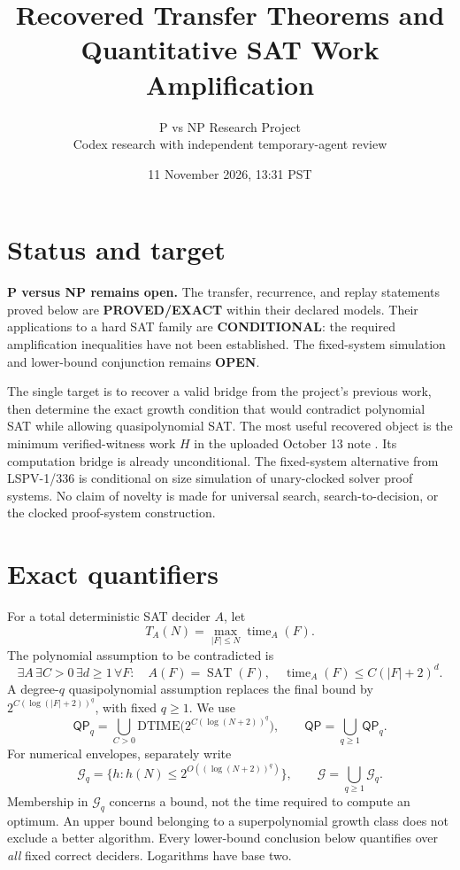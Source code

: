\documentclass[11pt]{article}
\title{Recovered Transfer Theorems and Quantitative SAT Work Amplification}
\author{P vs NP Research Project\\Codex research with independent temporary-agent review}
\date{11 November 2026, 13:31 PST}
\newcommand{\SAT}{\operatorname{SAT}}
\newcommand{\QP}{\mathsf{QP}}
\begin{document}
\maketitle

\section*{Status and target}
\textbf{P versus NP remains open.}
The transfer, recurrence, and replay statements proved below are
\textbf{PROVED/EXACT} within their declared models. Their applications to a
hard SAT family are \textbf{CONDITIONAL}: the required amplification
inequalities have not been established. The fixed-system simulation and
lower-bound conjunction remains \textbf{OPEN}.

The single target is to recover a valid bridge from the project's previous
work, then determine the exact growth condition that would contradict
polynomial SAT while allowing quasipolynomial SAT. The most useful recovered
object is the minimum verified-witness work $H$ in the uploaded October 13
note \cite{proofnote2026}. Its computation bridge is already unconditional. The fixed-system
alternative from LSPV-1/336 is conditional on size simulation of unary-clocked
solver proof systems. No claim of novelty is made for universal search,
search-to-decision, or the clocked proof-system construction.

\section*{Exact quantifiers}
For a total deterministic SAT decider $A$, let
\[
 T_A(N)=\max_{|F|\le N}\operatorname{time}_A(F).
\]
The polynomial assumption to be contradicted is
\[
 \exists A\,\exists C>0\,\exists d\ge1\,\forall F:
 \quad A(F)=\SAT(F),\quad
 \operatorname{time}_A(F)\le C(|F|+2)^d.
 \tag{P}
\]
A degree-$q$ quasipolynomial assumption replaces the final bound by
$2^{C(\log(|F|+2))^q}$, with fixed $q\ge1$. We use
\[
 \QP_q=\bigcup_{C>0}\mathrm{DTIME}
       \bigl(2^{C(\log(N+2))^q}\bigr),\qquad
 \QP=\bigcup_{q\ge1}\QP_q.
\]
For numerical envelopes, separately write
\[
 \mathcal G_q=\{h:h(N)\le2^{O((\log(N+2))^q)}\},\qquad
 \mathcal G=\bigcup_{q\ge1}\mathcal G_q.
\]
Membership in $\mathcal G_q$ concerns a bound, not the time required to
compute an optimum.
An upper bound belonging to a superpolynomial growth class does not exclude
a better algorithm. Every lower-bound conclusion below quantifies over
\emph{all} fixed correct deciders. Logarithms have base two.
\end{document}
